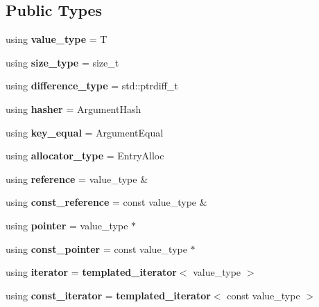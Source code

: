 \subsection*{Public Types}
\begin{DoxyCompactItemize}
\item 
using {\bfseries value\+\_\+type} = T\label{classska_1_1detailv3_1_1sherwood__v3__table_a7a330655116a4689d2773e70c2cce1e9}

\item 
using {\bfseries size\+\_\+type} = size\+\_\+t\label{classska_1_1detailv3_1_1sherwood__v3__table_a3eb8f63db4c50b2320d338080e168256}

\item 
using {\bfseries difference\+\_\+type} = std\+::ptrdiff\+\_\+t\label{classska_1_1detailv3_1_1sherwood__v3__table_a4c2b338c837bd856f7be26bdce7b07d3}

\item 
using {\bfseries hasher} = Argument\+Hash\label{classska_1_1detailv3_1_1sherwood__v3__table_aea93b8f5328be725ee604a83030bac78}

\item 
using {\bfseries key\+\_\+equal} = Argument\+Equal\label{classska_1_1detailv3_1_1sherwood__v3__table_a379f2dfd91ff26565494627c05ff6601}

\item 
using {\bfseries allocator\+\_\+type} = Entry\+Alloc\label{classska_1_1detailv3_1_1sherwood__v3__table_aadeab54e08794b84096f0121ae34b20f}

\item 
using {\bfseries reference} = value\+\_\+type \&\label{classska_1_1detailv3_1_1sherwood__v3__table_a5ceebd69a463a2b22bf0309d94a5845e}

\item 
using {\bfseries const\+\_\+reference} = const value\+\_\+type \&\label{classska_1_1detailv3_1_1sherwood__v3__table_a51ed14b89b4f0a2686ef8f3e2e04e627}

\item 
using {\bfseries pointer} = value\+\_\+type $\ast$\label{classska_1_1detailv3_1_1sherwood__v3__table_ad88e1efd3999da1b71222b1e879c20ce}

\item 
using {\bfseries const\+\_\+pointer} = const value\+\_\+type $\ast$\label{classska_1_1detailv3_1_1sherwood__v3__table_afbb2322b78493266fbe1051532079218}

\item 
using {\bfseries iterator} = {\bf templated\+\_\+iterator}$<$ value\+\_\+type $>$\label{classska_1_1detailv3_1_1sherwood__v3__table_a6e73347b55cd49666d63f765e2afbfbe}

\item 
using {\bfseries const\+\_\+iterator} = {\bf templated\+\_\+iterator}$<$ const value\+\_\+type $>$\label{classska_1_1detailv3_1_1sherwood__v3__table_a381786dc71b4f6f2793ceabe496f7d04}

\end{DoxyCompactItemize}
